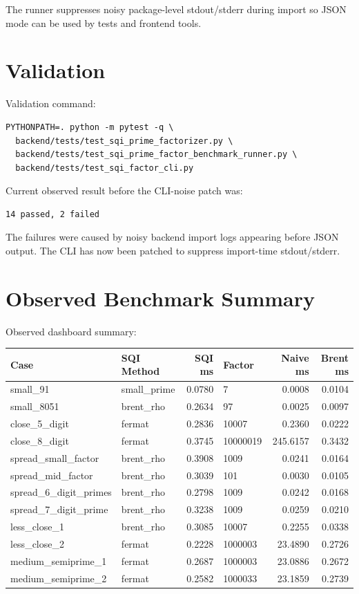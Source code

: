 \documentclass[11pt,a4paper]{article}
\begin{document}
The runner suppresses noisy package-level stdout/stderr during import so JSON mode can be
used by tests and frontend tools.

\section{Validation}

Validation command:

\begin{verbatim}
PYTHONPATH=. python -m pytest -q \
  backend/tests/test_sqi_prime_factorizer.py \
  backend/tests/test_sqi_prime_factor_benchmark_runner.py \
  backend/tests/test_sqi_factor_cli.py
\end{verbatim}

Current observed result before the CLI-noise patch was:

\begin{verbatim}
14 passed, 2 failed
\end{verbatim}

The failures were caused by noisy backend import logs appearing before JSON output. The CLI
has now been patched to suppress import-time stdout/stderr.

\section{Observed Benchmark Summary}

Observed dashboard summary:

\begin{tabularx}{\textwidth}{@{}l l r l r r@{}}
\textbf{Case} & \textbf{SQI Method} & \textbf{SQI ms} & \textbf{Factor} & \textbf{Naive ms} & \textbf{Brent ms} \\
\hline
small\_91 & small\_prime & 0.0780 & 7 & 0.0008 & 0.0104 \\
small\_8051 & brent\_rho & 0.2634 & 97 & 0.0025 & 0.0097 \\
close\_5\_digit & fermat & 0.2836 & 10007 & 0.2360 & 0.0222 \\
close\_8\_digit & fermat & 0.3745 & 10000019 & 245.6157 & 0.3432 \\
spread\_small\_factor & brent\_rho & 0.3908 & 1009 & 0.0241 & 0.0164 \\
spread\_mid\_factor & brent\_rho & 0.3039 & 101 & 0.0030 & 0.0105 \\
spread\_6\_digit\_primes & brent\_rho & 0.2798 & 1009 & 0.0242 & 0.0168 \\
spread\_7\_digit\_prime & brent\_rho & 0.3238 & 1009 & 0.0259 & 0.0210 \\
less\_close\_1 & brent\_rho & 0.3085 & 10007 & 0.2255 & 0.0338 \\
less\_close\_2 & fermat & 0.2228 & 1000003 & 23.4890 & 0.2726 \\
medium\_semiprime\_1 & fermat & 0.2687 & 1000003 & 23.0886 & 0.2672 \\
medium\_semiprime\_2 & fermat & 0.2582 & 1000033 & 23.1859 & 0.2739 \\
\end{tabularx}
\end{document}
